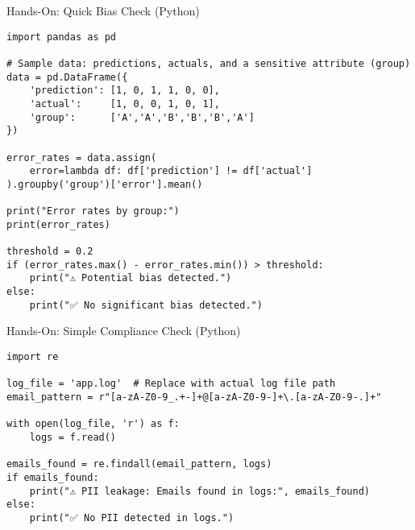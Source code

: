 \documentclass[aspectratio=169]{beamer}
\begin{document}
%
%
\begin{frame}{Hands-On: Quick Bias Check (Python)}
\begin{verbatim}
import pandas as pd

# Sample data: predictions, actuals, and a sensitive attribute (group)
data = pd.DataFrame({
    'prediction': [1, 0, 1, 1, 0, 0],
    'actual':     [1, 0, 0, 1, 0, 1],
    'group':      ['A','A','B','B','B','A']
})

error_rates = data.assign(
    error=lambda df: df['prediction'] != df['actual']
).groupby('group')['error'].mean()

print("Error rates by group:")
print(error_rates)

threshold = 0.2
if (error_rates.max() - error_rates.min()) > threshold:
    print("⚠️ Potential bias detected.")
else:
    print("✅ No significant bias detected.")
\end{verbatim}
\end{frame}

\begin{frame}{Hands-On: Simple Compliance Check (Python)}
\begin{verbatim}
import re

log_file = 'app.log'  # Replace with actual log file path
email_pattern = r"[a-zA-Z0-9_.+-]+@[a-zA-Z0-9-]+\.[a-zA-Z0-9-.]+"

with open(log_file, 'r') as f:
    logs = f.read()

emails_found = re.findall(email_pattern, logs)
if emails_found:
    print("⚠️ PII leakage: Emails found in logs:", emails_found)
else:
    print("✅ No PII detected in logs.")
\end{verbatim}
\end{frame}
\end{document}
